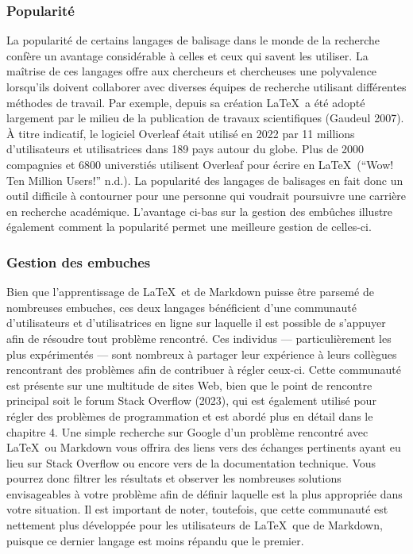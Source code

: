 \documentclass[
  letterpaper,
]{scrbook}
\begin{document}
\hypertarget{popularituxe9}{%
\subsubsection{Popularité}\label{popularituxe9}}

La popularité de certains langages de balisage dans le monde de la
recherche confère un avantage considérable à celles et ceux qui savent
les utiliser. La maîtrise de ces langages offre aux chercheurs et
chercheuses une polyvalence lorsqu'ils doivent collaborer avec diverses
équipes de recherche utilisant différentes méthodes de travail. Par
exemple, depuis sa création \LaTeX~a été adopté largement par le milieu
de la publication de travaux scientifiques (Gaudeul 2007). À titre
indicatif, le logiciel Overleaf était utilisé en 2022 par 11 millions
d'utilisateurs et utilisatrices dans 189 pays autour du globe. Plus de
2000 compagnies et 6800 universtiés utilisent Overleaf pour écrire en
\LaTeX~({``Wow! {Ten} Million Users!''} n.d.). La popularité des
langages de balisages en fait donc un outil difficile à contourner pour
une personne qui voudrait poursuivre une carrière en recherche
académique. L'avantage ci-bas sur la gestion des embûches illustre
également comment la popularité permet une meilleure gestion de
celles-ci.

\hypertarget{gestion-des-embuches}{%
\subsubsection{Gestion des embuches}\label{gestion-des-embuches}}

Bien que l'apprentissage de \LaTeX~et de Markdown puisse être parsemé de
nombreuses embuches, ces deux langages bénéficient d'une communauté
d'utilisateurs et d'utilisatrices en ligne sur laquelle il est possible
de s'appuyer afin de résoudre tout problème rencontré. Ces individus ---
particulièrement les plus expérimentés --- sont nombreux à partager leur
expérience à leurs collègues rencontrant des problèmes afin de
contribuer à régler ceux-ci. Cette communauté est présente sur une
multitude de sites Web, bien que le point de rencontre principal soit le
forum Stack Overflow (2023), qui est également utilisé pour régler des
problèmes de programmation et est abordé plus en détail dans le chapitre
4. Une simple recherche sur Google d'un problème rencontré avec
\LaTeX~ou Markdown vous offrira des liens vers des échanges pertinents
ayant eu lieu sur Stack Overflow ou encore vers de la documentation
technique. Vous pourrez donc filtrer les résultats et observer les
nombreuses solutions envisageables à votre problème afin de définir
laquelle est la plus appropriée dans votre situation. Il est important
de noter, toutefois, que cette communauté est nettement plus développée
pour les utilisateurs de \LaTeX~que de Markdown, puisque ce dernier
langage est moins répandu que le premier.
\end{document}
